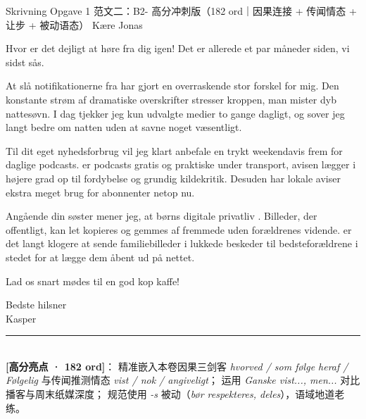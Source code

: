 \begin{emailbox}{Skrivning Opgave 1 范文二：B2- 高分冲刺版（182 ord｜因果连接 + 传闻情态 + 让步 + 被动语态）}
Kære Jonas

\vspace{0.25em}
Hvor er det dejligt at høre fra dig igen! Det er  allerede et par måneder siden, vi sidst sås.

\vspace{0.25em}
At slå notifikationerne fra har  gjort en overraskende stor forskel for mig. Den konstante strøm af dramatiske overskrifter stresser kroppen,  man mister dyb nattesøvn. I dag tjekker jeg kun udvalgte medier to gange dagligt, og  sover jeg langt bedre om natten uden at savne noget væsentligt.

\vspace{0.25em}
Til dit eget nyhedsforbrug vil jeg klart anbefale en trykt weekendavis frem for daglige podcasts.  er podcasts gratis og praktiske under transport,  avisen lægger i højere grad op til fordybelse og grundig kildekritik. Desuden har lokale aviser  ekstra meget brug for abonnenter netop nu.

\vspace{0.25em}
Angående din søster mener jeg, at børns digitale privatliv . Billeder, der  offentligt, kan  let kopieres og gemmes af fremmede uden forældrenes vidende.  er det langt klogere at sende familiebilleder i lukkede beskeder til bedsteforældrene i stedet for at lægge dem åbent ud på nettet.

\vspace{0.25em}
Lad os snart mødes til en god kop kaffe!

\vspace{0.25em}
Bedste hilsner\\
Kasper

\vspace{0.3em}
\rule{\linewidth}{0.4pt}\\[0.2em]
\small\textbf{\color{NCDNavy}[高分亮点 · 182 ord]}： 精准嵌入本卷因果三剑客 \textit{hvorved / som følge heraf / Følgelig} 与传闻推测情态 \textit{vist / nok / angiveligt}； 运用 \textit{Ganske vist..., men...} 对比播客与周末纸媒深度； 规范使用 \textit{-s} 被动（\textit{bør respekteres, deles}），语域地道老练。
\end{emailbox}


